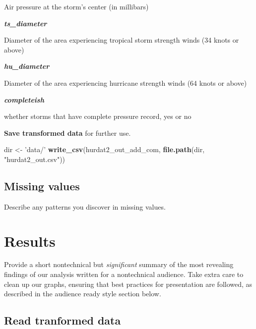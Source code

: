 \documentclass[]{book}
\newenvironment{Shaded}{\begin{snugshade}}{\end{snugshade}}
\newcommand{\KeywordTok}[1]{\textcolor[rgb]{0.13,0.29,0.53}{\textbf{#1}}}
\newcommand{\NormalTok}[1]{#1}
\newcommand{\StringTok}[1]{\textcolor[rgb]{0.31,0.60,0.02}{#1}}
\begin{document}
Air pressure at the storm's center (in millibars)

\textbf{\emph{ts\_diameter}}

Diameter of the area experiencing tropical storm strength winds (34 knots or above)

\textbf{\emph{hu\_diameter}}

Diameter of the area experiencing hurricane strength winds (64 knots or above)

\textbf{\emph{completeish}}

whether storms that have complete pressure record, yes or no

\textbf{Save transformed data} for further use.

\begin{Shaded}
\begin{Highlighting}[]
\NormalTok{dir <-}\StringTok{ 'data/'}
\KeywordTok{write_csv}\NormalTok{(hurdat2_out_add_com, }\KeywordTok{file.path}\NormalTok{(dir, }\StringTok{"hurdat2_out.csv"}\NormalTok{))}
\end{Highlighting}
\end{Shaded}

\hypertarget{missing-values}{%
\section{Missing values}\label{missing-values}}

Describe any patterns you discover in missing values.

\hypertarget{results}{%
\chapter{Results}\label{results}}

Provide a short nontechnical but \emph{significant} summary of the most revealing findings of our analysis written for a nontechnical audience. Take extra care to clean up our graphs, ensuring that best practices for presentation are followed, as described in the audience ready style section below.

\hypertarget{read-tranformed-data}{%
\section{Read tranformed data}\label{read-tranformed-data}}
\end{document}

